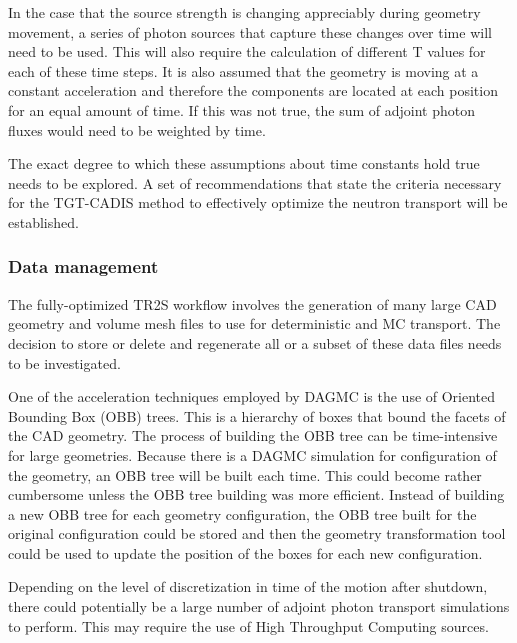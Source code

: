 In the case that the source strength is changing appreciably during geometry
movement, a  series of photon sources that capture these changes over time
will need to be used.  This will also require the calculation of different T
values for each of these time steps.
It is also assumed that the geometry is moving at a constant acceleration
and therefore the components are located at each position for an equal amount of time.  If
this was not true, the sum of adjoint photon fluxes would need to be weighted
by time. 

The exact degree to which these assumptions about time constants hold true
needs to be explored. A set of recommendations %
that state the criteria 
necessary for the TGT-CADIS method to effectively optimize the neutron
transport  will
be established.

\subsubsection{Data management}
The fully-optimized TR2S workflow involves the generation of many large
CAD geometry and volume mesh files to use for deterministic and MC transport.
The decision to store or delete and regenerate all or a subset of these data files needs to
be investigated.

One of the acceleration techniques employed by DAGMC is the use of Oriented
Bounding Box (OBB) trees.  This is a hierarchy of boxes that bound the facets 
of the CAD geometry.  The process of building the OBB tree can be
time-intensive for large geometries.  Because there is a DAGMC simulation for
configuration of the geometry, an OBB tree will be built each time.  This could
become rather cumbersome unless the OBB tree building was more efficient.
Instead of building a new OBB tree for each geometry configuration, the OBB
tree built for the original configuration could be stored and then the geometry
transformation tool could be used to update the position of the boxes for each 
new configuration.

Depending on the level of discretization in time of the motion after shutdown,
there could potentially be a large number of adjoint photon transport
simulations to perform.  This may require the use of High Throughput Computing
sources.

